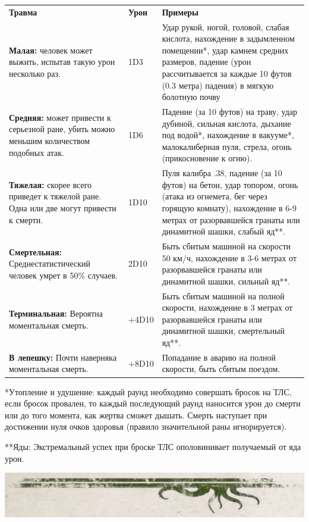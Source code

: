 \documentclass[letterpaper,twocolumn,openany, twoside, 11pt, usenames]{cocbook}
\begin{document}
\begin{fullcocpaperbox}{}{}
  \begin{tabularx}{170mm}{XYX}
  \color{CoCPaperBox}\bfseries Травма & \color{CoCPaperBox}\bfseries Урон & \color{CoCPaperBox}\bfseries Примеры \\
  \textbf{Малая:} человек может выжить, испытав такую урон несколько раз. & 1D3 & Удар рукой, ногой, головой, слабая кислота, нахождение в задымленном помещении*, удар камнем средних размеров, падение (урон рассчитывается за каждые 10 футов (0.3 метра) падения) в мягкую болотную почву \\
  \textbf{Средняя:} может привести к серьезной ране, убить можно меньшим количеством подобных атак. & 1D6 & Падение (за 10 футов) на траву, удар дубиной, сильная кислота, дыхание под водой*, нахождение в вакууме*, малокалиберная пуля, стрела, огонь (прикосновение к огню). \\
  \textbf{Тяжелая:} скорее всего приведет к тяжелой ране. Одна или две могут привести к смерти. & 1D10 & Пуля калибра .38, падение (за 10 футов) на бетон, удар топором, огонь (атака из огнемета, бег через горящую комнату), нахождение в 6-9 метрах от разорвавшейся гранаты или динамитной шашки, слабый яд**.\\
  \textbf{Смертельная:} Среднестатистический человек умрет в 50\% случаев. & 2D10 & Быть сбитым машиной на скорости 50 км/ч, нахождение в 3-6 метрах от разорвавшейся гранаты или динамитной шашки, сильный яд**. \\
  \textbf{Терминальная:} Вероятна моментальная смерть. & +4D10 & Быть сбитым машиной на полной скорости, нахождение в 3 метрах от разорвавшейся гранаты или динамитной шашки, смертельный яд**. \\
  \textbf{В лепешку:} Почти наверняка моментальная смерть. & +8D10 & Попадание в аварию на полной скорости, быть сбитым поездом. \\
  \end{tabularx}
\smallbreak
*Утопление и удушение: каждый раунд необходимо совершать бросок на ТЛС, если бросок провален, то каждый последующий раунд наносится урон до смерти или до того момента, как жертва сможет дышать. Смерть наступает при достижении нуля очков здоровья (правило значительной раны игнорируется).

**Яды: Экстремальный успех при броске ТЛС ополовинивает получаемый от яда урон.

  \includegraphics[width=\linewidth]{img/bottom.png}
\end{fullcocpaperbox}
\end{document}
